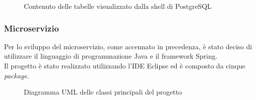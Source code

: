 \begin{figure}[ht]
	\centering
	\caption{Contenuto delle tabelle visualizzato dalla shell di PostgreSQL}
	\label{fig:one}
\end{figure}

\subsubsection{Microservizio}
Per lo sviluppo del microservizio, come accennato in precedenza, è stato deciso di utilizzare il linguaggio di programmazione Java e il framework Spring.\\
Il progetto è stato realizzato utilizzando l'IDE Eclipse ed è composto da cinque \emph{package}.
\begin{figure}[h]
	\centering
	\caption{Diagramma UML delle classi principali del progetto}
	\label{fig:one}
\end{figure}

